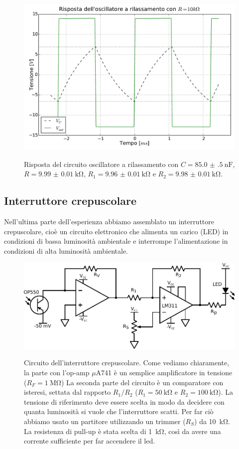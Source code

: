 \begin{figure}[ht]
 \centering
   {\includegraphics[width=14cm]{../E04/latex/osc10k.pdf}}
 \caption{Risposta del circuito oscillatore a rilassamento con $C=\SI{85.0(5)}{\nano\farad}$, $R=\SI{9.99(1)}{\kohm}$, $R_1= \SI{9.96(1)}{\kohm}$ e $R_2=\SI{9.98(1)}{\kohm}$.}
 \label{gr4:osc10k}
\end{figure}

\subsection{Interruttore crepuscolare}

Nell'ultima parte dell'esperienza abbiamo assemblato un interruttore crepuscolare, cioè un circuito elettronico che alimenta un carico (LED) in condizioni di bassa luminosità ambientale e interrompe l'alimentazione in condizioni di alta luminosità ambientale.

\begin{figure}[ht]
 \centering
   {\includegraphics[width=13.5cm]{../E04/latex/c_crepuscolare.pdf}}
 \caption{Circuito dell'interruttore crepuscolare. Come vediamo chiaramente, la parte con l'op-amp $\mu$A741 è un semplice amplificatore in tensione ($R_F = \SI{1}{\Mohm}$) La seconda parte del circuito è un comparatore con isteresi, settata dal rapporto $R_1/R_2$ ($R_1 = \SI{50}{\kohm}$ e $R_2 = \SI{100}{\kohm}$). La tensione di riferimento deve essere scelta in modo da decidere con quanta luminosità si vuole che l'interruttore scatti. Per far ciò abbiamo usato un partitore utilizzando un trimmer ($R_S$) da \SI{10}{\kohm}. La resistenza di pull-up è stata scelta di  \SI{1}{\kohm}, così da avere una corrente sufficiente per far accendere il led.}
 \label{cir4:crepuscolare}
\end{figure}


